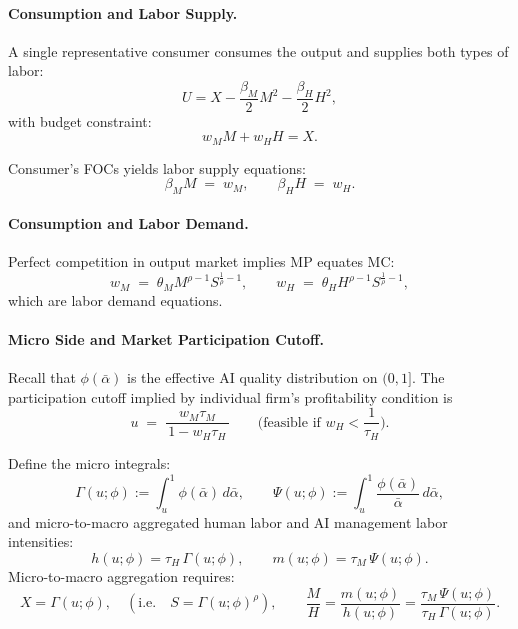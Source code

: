 \documentclass[english]{article}
\begin{document}
\paragraph{Consumption and Labor Supply.}
A single representative consumer consumes the output and supplies both types of labor:
\[
U = X - \frac{\beta_M}{2}M^2 - \frac{\beta_H}{2}H^2,
\]
with budget constraint:
\[
w_M M + w_H H = X.
\]

Consumer's FOCs yields labor supply equations:
\begin{equation}
\beta_M M \;=\; w_M,
\qquad
\beta_H H \;=\; w_H. \label{eq:labor_supply}
\end{equation}


\paragraph{Consumption and Labor Demand.}
Perfect competition in output market implies MP equates MC:
\begin{equation}
w_M \;=\; \theta_M M^{\rho-1} S^{\frac{1}{\rho}-1},
\qquad
w_H \;=\; \theta_H H^{\rho-1} S^{\frac{1}{\rho}-1}, \label{eq:labor_demand}
\end{equation}
which are labor demand equations.

\paragraph{Micro Side and Market Participation Cutoff.}
Recall that $\phi(\bar{\alpha})$ is the effective AI quality distribution on $(0,1]$.
The participation cutoff implied by individual firm's profitability condition is
\begin{equation}
u \;=\; \frac{w_M\tau_M}{\,1-w_H\tau_H\,}
\qquad\text{(feasible if \ }w_H < \frac{1}{\tau_H}\text{)}. \label{eq:u_def}
\end{equation}

Define the micro integrals:
\begin{equation}
\Gamma(u;\phi):=\int_{u}^{1}\phi(\bar{\alpha})\,d\bar{\alpha},
\qquad
\Psi(u;\phi):=\int_{u}^{1}\frac{\phi(\bar{\alpha})}{\bar{\alpha}}\,d\bar{\alpha}, \label{eq:micro_integrals}
\end{equation}
and micro-to-macro aggregated human labor and AI management labor intensities:
\[
h(u;\phi)=\tau_H\,\Gamma(u;\phi),
\qquad 
m(u;\phi)=\tau_M\,\Psi(u;\phi).
\]
Micro-to-macro aggregation requires:
\begin{equation}
X=\Gamma(u;\phi),\quad (\text{i.e.}\quad S=\Gamma(u;\phi)^{\rho}),
\qquad 
\frac{M}{H}=\frac{m(u;\phi)}{h(u;\phi)}=\frac{\tau_M\,\Psi(u;\phi)}{\tau_H\,\Gamma(u;\phi)}.
\label{eq:AggMix}
\end{equation}
\end{document}
